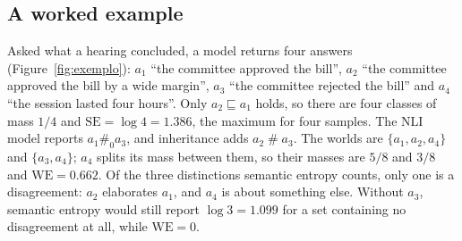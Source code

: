 \documentclass[english]{desafiokunumi}
\theoremstyle{definition}
\theoremstyle{remark}
\newcommand{\SE}{\mathrm{SE}}
\newcommand{\WE}{\mathrm{WE}}
\newcommand{\cf}{\mathrel{\#}}
\newcommand{\cfz}{\mathrel{\#_0}}
\begin{document}
\subsection{A worked example}
\label{sec:exemplo}

Asked what a hearing concluded, a model returns four answers
(Figure~\ref{fig:exemplo}): $a_1$ ``the committee approved the bill'', $a_2$
``the committee approved the bill by a wide margin'', $a_3$ ``the committee
rejected the bill'' and $a_4$ ``the session lasted four hours''. Only
$a_2 \sqsubseteq a_1$ holds, so there are four classes of mass $1/4$ and
$\SE = \log 4 = 1.386$, the maximum for four samples. The NLI model reports
$a_1 \cfz a_3$, and inheritance adds $a_2 \cf a_3$. The worlds are
$\{a_1, a_2, a_4\}$ and $\{a_3, a_4\}$; $a_4$ splits its mass between them, so
their masses are $5/8$ and $3/8$ and $\WE = 0.662$. Of the three distinctions
semantic entropy counts, only one is a disagreement: $a_2$ elaborates $a_1$,
and $a_4$ is about something else. Without $a_3$, semantic entropy would still
report $\log 3 = 1.099$ for a set containing no disagreement at all, while
$\WE = 0$.
\end{document}
